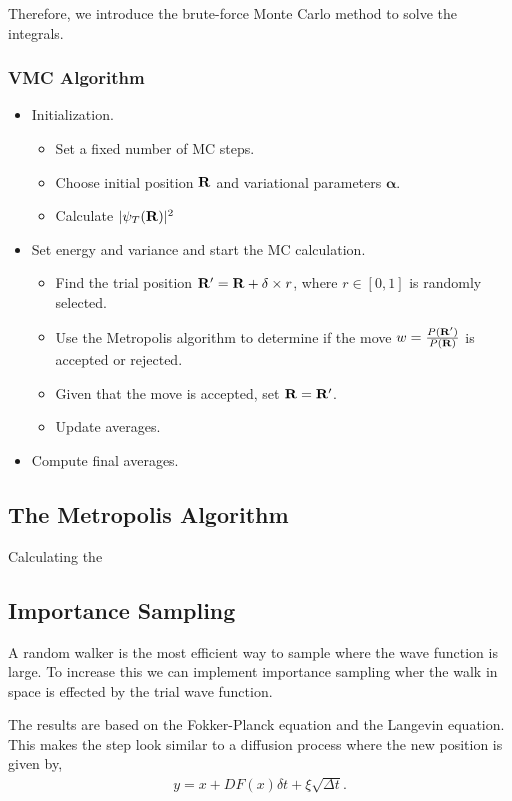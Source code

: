 \documentclass[twocolumn]{article}[10pt]
\renewcommand\vec[1]{{\bf #1}}
\begin{document}
Therefore, we introduce the brute-force Monte Carlo method
to solve the integrals.

\subsubsection{VMC Algorithm}

\begin{itemize}
    \item Initialization.
    \begin{itemize}    
        \item Set a fixed number of MC steps.
        \item Choose initial position $\vec R$ and variational
            parameters $\boldsymbol\alpha$.
        \item Calculate $|\psi_T(\vec R)|^2$
    \end{itemize}
    \item Set energy and variance and start the MC calculation.
    \begin{itemize}    
        \item Find the trial position $\vec R' =\vec R + \delta\times r $,
            where $r\in [0,1]$ is randomly selected.
        \item Use the Metropolis algorithm to determine if the
            move $w =\frac{P(\vec R')}{P(\vec R)}$ is accepted or rejected.
        \item Given that the move is accepted, set $\vec R = \vec R'$.
        \item Update averages.
    \end{itemize}
    \item Compute final averages.
\end{itemize}

\subsection{The Metropolis Algorithm}
Calculating the 


\subsection{Importance Sampling}
A random walker is the most efficient way to sample where the
wave function is large. To increase this we can implement importance
sampling wher the walk in space is effected by the trial wave function. 

The results are based on the Fokker-Planck equation and the Langevin 
equation. This makes the step look similar to a diffusion process
where the new position is given by,
\begin{align*}
y = x + DF(x) \delta t + \xi \sqrt{\Delta t}.
\end{align*}
\end{document}
